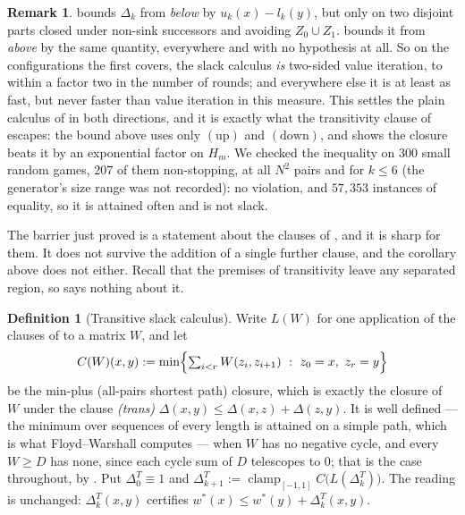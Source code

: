 \documentclass[11pt]{article}
\theoremstyle{plain}
\theoremstyle{definition}
\newtheorem{definition}[theorem]{Definition}
\newtheorem{remark}[theorem]{Remark}
\begin{document}
\begin{remark}\label{rem:slack-sandwich}
 bounds $\Delta_k$ from \emph{below} by
$u_k(x)-l_k(y)$, but only on two disjoint parts closed under non-sink
successors and avoiding $Z_0\cup Z_1$.  bounds it from
\emph{above} by the same quantity, everywhere and with no hypothesis at all. So
on the configurations the first covers, the slack calculus \emph{is} two-sided
value iteration, to within a factor two in the number of rounds; and everywhere
else it is at least as fast, but never faster than value iteration in this
measure. This settles the plain calculus of  in both
directions, and it is exactly what the transitivity clause of
 escapes: the bound above uses only $(\mathrm{up})$ and
$(\mathrm{down})$, and  shows the closure beats it by an
exponential factor on $H_m$. We checked the inequality on $300$ small random games,
$207$ of them non-stopping, at all $N^{2}$ pairs and for $k\le6$ (the
generator's size range was not recorded): no violation, and $57{,}353$
instances of equality, so it is attained often and is not slack.
\end{remark}



\medskip
The barrier just proved is a statement about the clauses of
, and it is sharp for them. It does not survive the
addition of a single further clause, and the corollary above does not
either. Recall that the premises of transitivity leave any separated
region, so  says nothing about it.

\begin{definition}[Transitive slack calculus]\label{def:trans-slack}
Write $L(W)$ for one application of the clauses of  to a
matrix $W$, and let
\[
  C(W)(x,y):=\min\Bigl\{\textstyle\sum_{i<r}W(z_i,z_{i+1})\ :\
    z_0=x,\ z_r=y\Bigr\}
\]
be the min-plus (all-pairs shortest path) closure, which is exactly the
closure of $W$ under the clause
\emph{(trans)} $\Delta(x,y)\le\Delta(x,z)+\Delta(z,y)$. It is well
defined --- the minimum over sequences of every length is attained on a
simple path, which is what Floyd--Warshall computes --- when $W$ has no
negative cycle, and every $W\ge D$ has none, since each cycle sum of $D$
telescopes to $0$; that is the case throughout, by
. Put
$\Delta^{T}_0\equiv1$ and
$\Delta^{T}_{k+1}:=\operatorname{clamp}_{[-1,1]}C\bigl(L(\Delta^{T}_k)\bigr)$.
The reading is unchanged: $\Delta^{T}_k(x,y)$ certifies
$w^\ast(x)\le w^\ast(y)+\Delta^{T}_k(x,y)$.
\end{definition}
\end{document}
